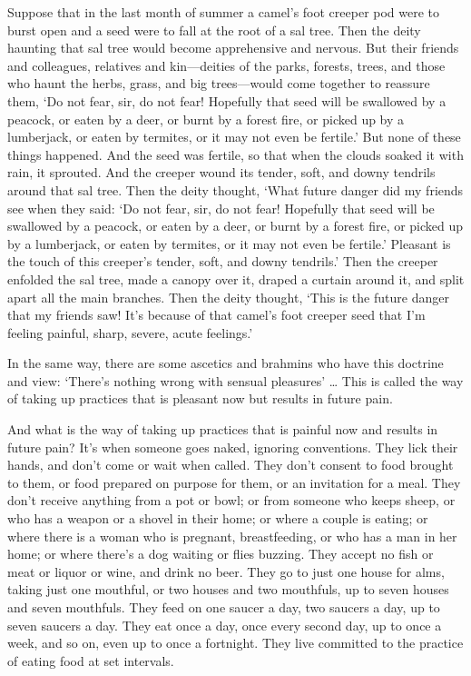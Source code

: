 \documentclass[12pt,openany]{book}%
\begin{document}
Suppose that in the last month of summer a camel’s foot creeper pod were to burst open and a seed were to fall at the root of a sal tree. Then the deity haunting that sal tree would become apprehensive and nervous. But their friends and colleagues, relatives and kin—deities of the parks, forests, trees, and those who haunt the herbs, grass, and big trees—would come together to reassure them, ‘Do not fear, sir, do not fear! Hopefully that seed will be swallowed by a peacock, or eaten by a deer, or burnt by a forest fire, or picked up by a lumberjack, or eaten by termites, or it may not even be fertile.’ But none of these things happened. And the seed was fertile, so that when the clouds soaked it with rain, it sprouted. And the creeper wound its tender, soft, and downy tendrils around that sal tree. Then the deity thought, ‘What future danger did my friends see when they said: ‘Do not fear, sir, do not fear! Hopefully that seed will be swallowed by a peacock, or eaten by a deer, or burnt by a forest fire, or picked up by a lumberjack, or eaten by termites, or it may not even be fertile.’ Pleasant is the touch of this creeper’s tender, soft, and downy tendrils.’ Then the creeper enfolded the sal tree, made a canopy over it, draped a curtain around it, and split apart all the main branches. Then the deity thought, ‘This is the future danger that my friends saw! It’s because of that camel’s foot creeper seed that I’m feeling painful, sharp, severe, acute feelings.’ 

In the same way, there are some ascetics and brahmins who have this doctrine and view: ‘There’s nothing wrong with sensual pleasures’ … This is called the way of taking up practices that is pleasant now but results in future pain. 

And what is the way of taking up practices that is painful now and results in future pain? It’s when someone goes naked, ignoring conventions. They lick their hands, and don’t come or wait when called. They don’t consent to food brought to them, or food prepared on purpose for them, or an invitation for a meal. They don’t receive anything from a pot or bowl; or from someone who keeps sheep, or who has a weapon or a shovel in their home; or where a couple is eating; or where there is a woman who is pregnant, breastfeeding, or who has a man in her home; or where there’s a dog waiting or flies buzzing. They accept no fish or meat or liquor or wine, and drink no beer. They go to just one house for alms, taking just one mouthful, or two houses and two mouthfuls, up to seven houses and seven mouthfuls. They feed on one saucer a day, two saucers a day, up to seven saucers a day. They eat once a day, once every second day, up to once a week, and so on, even up to once a fortnight. They live committed to the practice of eating food at set intervals. 
\end{document}
